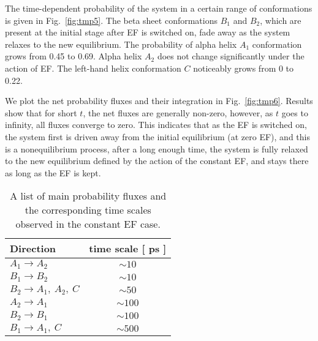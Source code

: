 \documentclass[a4paper,preprint,unsortedaddress,onecolumn]{revtex4-1}
\begin{document}
The time-dependent probability of the system in a certain range of conformations is given in
Fig.~\ref{fig:tmp5}. The beta sheet conformations $B_1$ and $B_2$,
which are present at the initial stage after EF is switched on,
fade away as the system relaxes to the new equilibrium. The
probability of alpha helix $A_1$ conformation grows from 0.45 to 0.69.
Alpha helix $A_2$  does not change significantly  under the action of EF.
The left-hand helix conformation $C$ noticeably grows from 0 to 0.22.

We plot the net probability fluxes and their integration in Fig.~\ref{fig:tmp6}.
Results show that for short $t$, the net fluxes are generally non-zero, however, 
as $t$ goes to infinity,
all fluxes converge to zero. This indicates
that as the EF is switched on, the system first is driven away from the initial
equilibrium (at zero EF), and this is a nonequilibrium process, 
after a long enough time, the system
is fully relaxed to the new equilibrium defined by the action of the constant EF,
and stays there as long as the EF is kept.

\begin{table}
  \centering
  \begin{tabular*}{0.4\textwidth}{@{\extracolsep{\fill}}lc}\hline\hline
    Direction        & time scale [ ps ] \\\hline
    $A_1\rightarrow A_2$        &       $\sim 10$      \\
    $B_1\rightarrow B_2$        &       $\sim 10$      \\    
    $B_2\rightarrow A_1,\ A_2,\ C$        &       $\sim 50$      \\    
    $A_2\rightarrow A_1$        &       $\sim 100$      \\
    $B_2\rightarrow B_1$        &       $\sim 100$      \\    
    $B_1\rightarrow A_1,\ C$        &       $\sim 500$      \\    \hline\hline
  \end{tabular*}
  \caption{A list of main probability fluxes and the corresponding time scales observed in the constant EF case.}
  \label{tab:tmp1}
\end{table}
\end{document}
